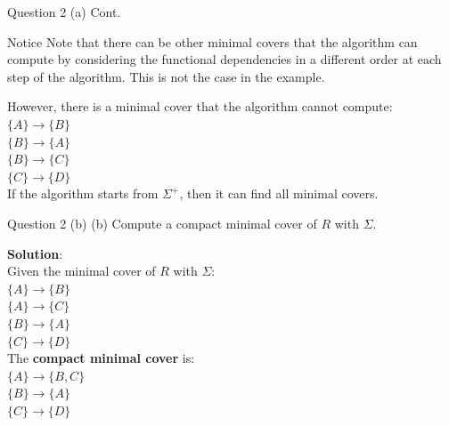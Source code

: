 \begin{frame}[fragile]{Question 2 (a) Cont.}
	\begin{alertblock}{Notice}
	Note that there can be other minimal covers that the algorithm can compute by considering the functional dependencies in a different order at each step of the algorithm. This is not the case in the example.
	\end{alertblock}\vspace{5pt}

	However, there is a minimal cover that the algorithm cannot compute:\\\vspace{5pt}
	$\{A\} \rightarrow \{B\}$\\
	$\{B\} \rightarrow \{A\}$\\
	$\{B\} \rightarrow \{C\}$\\
	$\{C\} \rightarrow \{D\}$\\\vspace{10pt}	
	If the algorithm starts from $\Sigma^{+}$, then it can find all minimal covers.
\end{frame}

\begin{frame}[fragile]{Question 2 (b)}
	(b) Compute a compact minimal cover of $R$ with $\Sigma$.\vspace{10pt}
	
	\textbf{Solution}: \\\vspace{5pt}
	Given the minimal cover of $R$ with $\Sigma$:\\\vspace{3pt}
	$\{A\} \rightarrow \{B\}$\\	
	$\{A\} \rightarrow \{C\}$\\	
	$\{B\} \rightarrow \{A\}$\\
	$\{C\} \rightarrow \{D\}$\\\vspace{5pt}
	The \textbf{compact minimal cover} is:\\\vspace{3pt}
	$\{A\} \rightarrow \{B, C\}$\\	
	$\{B\} \rightarrow \{A\}$\\	
	$\{C\} \rightarrow \{D\}$
\end{frame}

